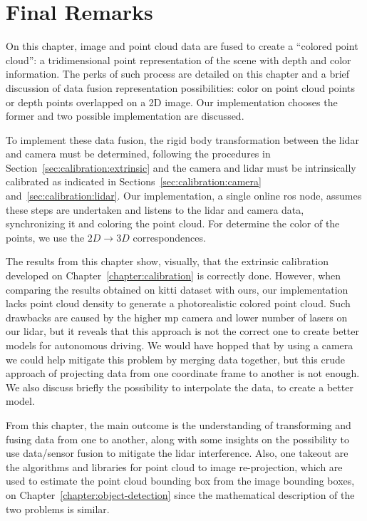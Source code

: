 \section{Final Remarks}
On this chapter, image and point cloud data are fused to create a ``colored point cloud'': a tridimensional point representation of the scene with depth and color information. The perks of such process are detailed on this chapter and a brief discussion of data fusion representation possibilities: color on point cloud points or depth points overlapped on a 2D image. Our implementation chooses the former and two possible implementation are discussed.  

To implement these data fusion, the rigid body transformation between the \ac{lidar} and camera must be determined, following the procedures in Section~\ref{sec:calibration:extrinsic} and the camera and \ac{lidar} must be intrinsically calibrated as indicated in Sections~\ref{sec:calibration:camera} and~\ref{sec:calibration:lidar}. Our implementation, a single online \ac{ros} node, assumes these steps are undertaken and listens to the \ac{lidar} and camera data, synchronizing it and coloring the point cloud. For determine the color of the points, we use the $2D \rightarrow 3D$ correspondences.

The results from this chapter show, visually, that the extrinsic calibration developed on Chapter~\ref{chapter:calibration} is correctly done. However, when comparing the results obtained on \ac{kitti} dataset with ours, our implementation lacks point cloud density to generate a photorealistic colored point cloud. Such drawbacks are caused by the higher \acl{mp} camera and lower number of lasers on our \ac{lidar}, but it reveals that this approach is not the correct one to create better models for autonomous driving. We would have hopped that by using a camera we could help mitigate this problem by merging data together, but this crude approach of projecting data from one coordinate frame to another is not enough. We also discuss briefly the possibility to interpolate the data, to create a better model.


From this chapter, the main outcome is the understanding of transforming and fusing data from one to another, along with some insights on the possibility to use data/sensor fusion to mitigate the \ac{lidar} interference. Also, one takeout are the algorithms and libraries for point cloud to image re-projection, which are used to estimate the point cloud bounding box from the image bounding boxes, on Chapter~\ref{chapter:object-detection} since the mathematical description of the two problems is similar.
